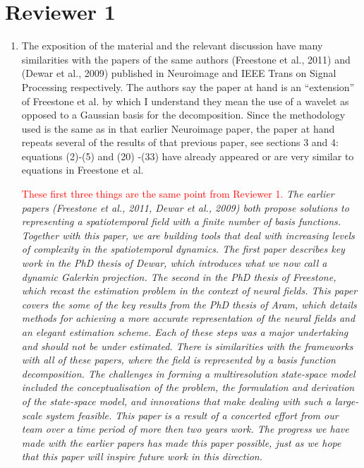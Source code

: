 \documentclass{article}
\newcommand{\dean}[1]{\textcolor{red}{#1}}
\begin{document}
    \section{Reviewer 1}
    


    \begin{enumerate}
        \item The exposition of the material and the relevant discussion have many similarities with the papers of the same authors (Freestone et al., 2011) and (Dewar et al., 2009) published in Neuroimage and IEEE Trans on Signal Processing  respectively. The authors say the paper at hand is an ``extension'' of Freestone et al. by which I understand they mean the use of a wavelet as opposed to a Gaussian basis for the decomposition. Since the methodology used is the same as in that earlier Neuroimage paper, the paper at hand repeats several of  the results of that previous paper, see sections 3 and 4: equations (2)-(5) and (20) -(33) have already appeared or are very similar to equations in Freestone et al.   
								 
\dean{These first three things are the same point from Reviewer 1.}
	\emph{The earlier papers (Freestone et al., 2011, Dewar et al., 2009) both propose solutions to representing a spatiotemporal field with a finite number of basis functions. Together with this paper, we are building tools that deal with increasing levels of complexity in the spatiotemporal dynamics. The first paper describes key work in the PhD thesis of Dewar, which introduces what we now call a dynamic Galerkin projection. The second in the PhD thesis of Freestone, which recast the estimation problem in the context of neural fields. This paper covers the some of the key results from the PhD thesis of Aram, which details methods for achieving a more accurate representation of the neural fields and an elegant estimation scheme. Each of these steps was a major undertaking and should not be under estimated. There is similarities with the frameworks with all of these papers, where the field is represented by a basis function decomposition. The challenges in forming a multiresolution state-space model included the conceptualisation of the problem, the formulation and derivation of the state-space model, and innovations that make dealing with such a large-scale system feasible. This paper is a result of a concerted effort from our team over a time period of more then two years work. The progress we have made with the earlier papers has made this paper possible, just as we hope that this paper will inspire future work in this direction.}
	        

\end{enumerate}
\end{document}

